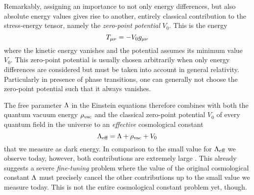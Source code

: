 \documentclass[12pt,parskip=half]{scrreprt}
\newcommand{\addref}{\todo[color=black!20]{ref.}}
\begin{document}
Remarkably, assigning an importance to not only energy differences, but also absolute energy values gives rise to another, entirely classical contribution to the stress-energy tensor, namely the \emph{zero-point potential} \(V_0\). This is the energy
\begin{equation}
	T_{\mu\nu} = - V_0 g_{\mu\nu}
\end{equation}
where the kinetic energy vanishes and the potential assumes its minimum value \(V_0\). This zero-point potential is usually chosen arbitrarily when only energy differences are considered but must be taken into account in general relativity. Particularly in presence of phase transitions, one can generally not choose the zero-point potential such that it always vanishes.

The free parameter \(\Lambda\) in the Einstein equations therefore combines with both the quantum vacuum energy \(\rho_\textnormal{vac}\) and the classical zero-point potential \(V_0\) of every quantum field in the universe to an \emph{effective} cosmological constant
\begin{equation}
	\Lambda_\textnormal{eff} = \Lambda + \rho_\textnormal{vac} + V_0
\end{equation}
that we measure as dark energy. In comparison to the small value for \(\Lambda_\textnormal{eff}\) we observe today, however, both contributions are extremely large \citep{Martin2012}. \addref This already suggests a severe \emph{fine-tuning} problem where the value of the original cosmological constant \(\Lambda\) must precisely cancel the other contributions up to the small value we measure today.  This is not the entire cosmological constant problem yet, though.
\end{document}
